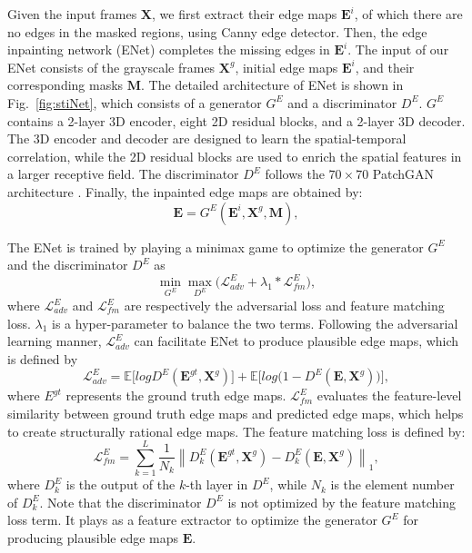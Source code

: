 Given the input frames $\boldsymbol{X}$, we first extract their edge maps $\boldsymbol{E}^{i}$, of which there are no edges in the masked regions, using Canny edge detector. 
Then, the edge inpainting network (ENet) completes the missing edges in $\boldsymbol{E}^{i}$.
The input of our ENet consists of the grayscale frames $\boldsymbol{X}^{g}$, initial edge maps $\boldsymbol{E}^{i}$, and their corresponding masks $\boldsymbol{M}$.
%
The detailed architecture of ENet is shown in Fig.~\ref{fig:stiNet}, which consists of a generator $G^E$ and a discriminator $D^E$.
$G^E$ contains a 2-layer 3D encoder, eight 2D residual blocks, and a 2-layer 3D decoder. 
The 3D encoder and decoder are designed to learn the spatial-temporal correlation, while the 2D residual blocks are used to enrich the spatial features in a larger receptive field. The discriminator $D^E$ follows the $70\times 70$ PatchGAN architecture \cite{Isola_2017_CVPR}. 
Finally, the inpainted edge maps are obtained by:
\begin{equation}
\label{eq:edgenet}
\boldsymbol{E}=G^E(\boldsymbol{E}^{i},\boldsymbol{X}^{g},\boldsymbol{M}),
\end{equation}

The ENet is trained by playing a minimax game to optimize the generator $G^E$ and the discriminator $D^E$ as
\begin{equation}
\label{eq:loss_e}
\min\limits_{G^E} \max \limits_{D^E} \big(\mathcal{L}^E_{adv}+\lambda_1 * \mathcal{L}^E_{fm}\big),
\end{equation}
where $\mathcal{L}^E_{adv}$ and $\mathcal{L}^E_{fm}$ are respectively the adversarial loss and feature matching loss. 
$\lambda_1$ is a hyper-parameter to balance the two terms.
%
Following the adversarial learning manner, $\mathcal{L}^E_{adv}$ can facilitate ENet to produce plausible edge maps, which is defined by
\begin{equation} \label{eq:edge_adver}
\mathcal{L}^E_{adv}  =\mathbb{E}\big[logD^E(\boldsymbol{E}^{gt},\boldsymbol{X}^{g})\big] +\mathbb{E} \big[log\big(1-D^E ( \boldsymbol{E},\boldsymbol{X}^{g})\big)\big],
\end{equation}
where $E^{gt}$ represents the ground truth edge maps. $\mathcal{L}^E_{fm}$ evaluates the feature-level similarity between ground truth edge maps and predicted edge maps, which helps to create structurally rational edge maps. 
The feature matching loss is defined by:
\begin{equation}
\label{eq:edge_fm}
\mathcal{L}^E_{fm}=\sum_{k=1}^L{\frac{1}{N_k}\left\| D^E_k(\boldsymbol{E}^{gt},\boldsymbol{X}^{g})- D^E_k(\boldsymbol{E},\boldsymbol{X}^{g})\right\|_1},
\end{equation}
where $D^E_k$ is the output of the $k$-th layer in $D^E$, while $N_k$ is the element number of $D^E_k$. 
Note that the discriminator $D^E$ is not optimized by the feature matching loss term. It plays as a feature extractor to optimize the generator $G^E$ for producing plausible edge maps $\boldsymbol{E}$.




